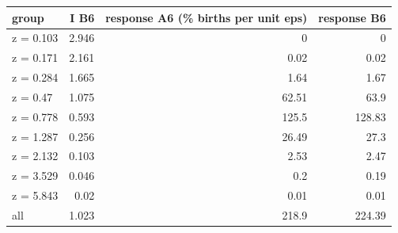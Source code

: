 \begin{tabular}{lrrr}
\toprule
group & I B6 & response A6 (\% births per unit eps) & response B6 \\
\midrule
z = 0.103 & 2.946 & 0 & 0 \\
z = 0.171 & 2.161 & 0.02 & 0.02 \\
z = 0.284 & 1.665 & 1.64 & 1.67 \\
z = 0.47 & 1.075 & 62.51 & 63.9 \\
z = 0.778 & 0.593 & 125.5 & 128.83 \\
z = 1.287 & 0.256 & 26.49 & 27.3 \\
z = 2.132 & 0.103 & 2.53 & 2.47 \\
z = 3.529 & 0.046 & 0.2 & 0.19 \\
z = 5.843 & 0.02 & 0.01 & 0.01 \\
all & 1.023 & 218.9 & 224.39 \\
\bottomrule
\end{tabular}
